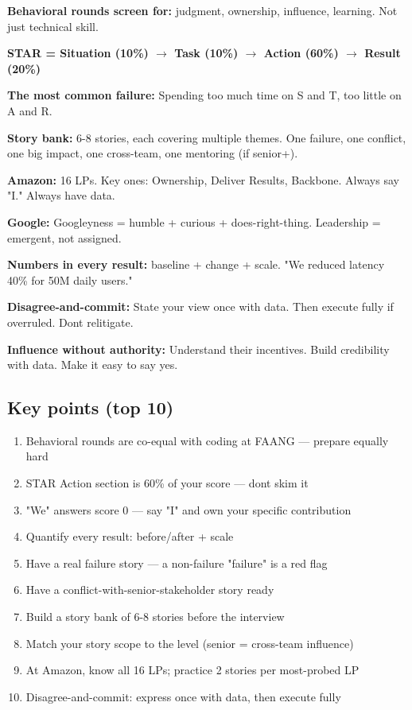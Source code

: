 \documentclass[11pt]{article}
\providecommand{\tightlist}{\setlength{\itemsep}{1pt}\setlength{\parskip}{0pt}}
\begin{document}
\textbf{Behavioral rounds screen for:} judgment, ownership, influence, learning. Not just technical skill.

\textbf{STAR = Situation (10\%) \(\rightarrow\) Task (10\%) \(\rightarrow\) Action (60\%) \(\rightarrow\) Result (20\%)}

\textbf{The most common failure:} Spending too much time on S and T, too little on A and R.

\textbf{Story bank:} 6-8 stories, each covering multiple themes. One failure, one conflict, one big impact, one cross-team, one mentoring (if senior+).

\textbf{Amazon:} 16 LPs. Key ones: Ownership, Deliver Results, Backbone. Always say "I." Always have data.

\textbf{Google:} Googleyness = humble + curious + does-right-thing. Leadership = emergent, not assigned.

\textbf{Numbers in every result:} baseline + change + scale. "We reduced latency 40\% for 50M daily users."

\textbf{Disagree-and-commit:} State your view once with data. Then execute fully if overruled. Don\textquotesingle t relitigate.

\textbf{Influence without authority:} Understand their incentives. Build credibility with data. Make it easy to say yes.

\subsection{Key points (top 10)}\label{key-points-top-10}

\begin{enumerate}
\def\labelenumi{\arabic{enumi}.}
\tightlist
\item
  Behavioral rounds are co-equal with coding at FAANG --- prepare equally hard
\item
  STAR Action section is 60\% of your score --- don\textquotesingle t skim it
\item
  "We" answers score 0 --- say "I" and own your specific contribution
\item
  Quantify every result: before/after + scale
\item
  Have a real failure story --- a non-failure "failure" is a red flag
\item
  Have a conflict-with-senior-stakeholder story ready
\item
  Build a story bank of 6-8 stories before the interview
\item
  Match your story scope to the level (senior = cross-team influence)
\item
  At Amazon, know all 16 LPs; practice 2 stories per most-probed LP
\item
  Disagree-and-commit: express once with data, then execute fully
\end{enumerate}
\end{document}
